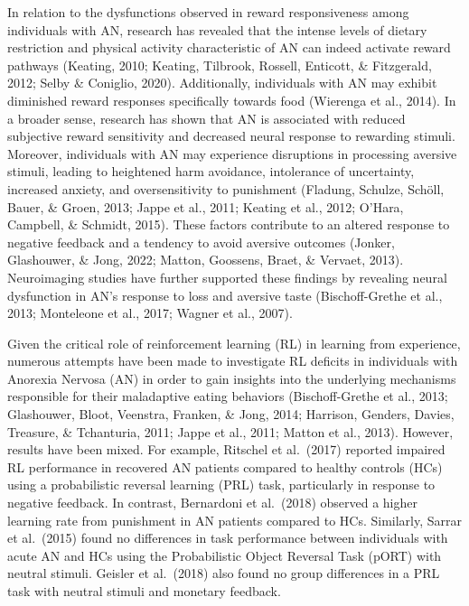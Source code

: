 \documentclass[
  man,floatsintext]{apa6}
\begin{document}
In relation to the dysfunctions observed in reward responsiveness among individuals with AN, research has revealed that the intense levels of dietary restriction and physical activity characteristic of AN can indeed activate reward pathways (Keating, 2010; Keating, Tilbrook, Rossell, Enticott, \& Fitzgerald, 2012; Selby \& Coniglio, 2020). Additionally, individuals with AN may exhibit diminished reward responses specifically towards food (Wierenga et al., 2014). In a broader sense, research has shown that AN is associated with reduced subjective reward sensitivity and decreased neural response to rewarding stimuli. Moreover, individuals with AN may experience disruptions in processing aversive stimuli, leading to heightened harm avoidance, intolerance of uncertainty, increased anxiety, and oversensitivity to punishment (Fladung, Schulze, Schöll, Bauer, \& Groen, 2013; Jappe et al., 2011; Keating et al., 2012; O'Hara, Campbell, \& Schmidt, 2015). These factors contribute to an altered response to negative feedback and a tendency to avoid aversive outcomes (Jonker, Glashouwer, \& Jong, 2022; Matton, Goossens, Braet, \& Vervaet, 2013). Neuroimaging studies have further supported these findings by revealing neural dysfunction in AN's response to loss and aversive taste (Bischoff-Grethe et al., 2013; Monteleone et al., 2017; Wagner et al., 2007).

Given the critical role of reinforcement learning (RL) in learning from experience, numerous attempts have been made to investigate RL deficits in individuals with Anorexia Nervosa (AN) in order to gain insights into the underlying mechanisms responsible for their maladaptive eating behaviors (Bischoff-Grethe et al., 2013; Glashouwer, Bloot, Veenstra, Franken, \& Jong, 2014; Harrison, Genders, Davies, Treasure, \& Tchanturia, 2011; Jappe et al., 2011; Matton et al., 2013). However, results have been mixed. For example, Ritschel et al.~(2017) reported impaired RL performance in recovered AN patients compared to healthy controls (HCs) using a probabilistic reversal learning (PRL) task, particularly in response to negative feedback. In contrast, Bernardoni et al.~(2018) observed a higher learning rate from punishment in AN patients compared to HCs. Similarly, Sarrar et al.~(2015) found no differences in task performance between individuals with acute AN and HCs using the Probabilistic Object Reversal Task (pORT) with neutral stimuli. Geisler et al.~(2018) also found no group differences in a PRL task with neutral stimuli and monetary feedback.
\end{document}
